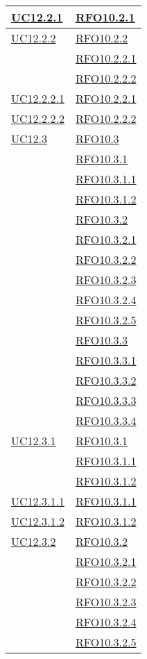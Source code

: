 \begin{longtable}{|>{\centering}m{5cm}|m{5cm}<{\centering}|}
\hyperlink{UC12.2.1}{UC12.2.1} & \hyperlink{RFO10.2.1}{RFO10.2.1}\\\hline
\hyperlink{UC12.2.2}{UC12.2.2} 
& \hyperlink{RFO10.2.2}{RFO10.2.2}\\
& \hyperlink{RFO10.2.2.1}{RFO10.2.2.1}\\
& \hyperlink{RFO10.2.2.2}{RFO10.2.2.2}\\\hline

\hyperlink{UC12.2.2.1}{UC12.2.2.1} & \hyperlink{RFO10.2.2.1}{RFO10.2.2.1}\\\hline
\hyperlink{UC12.2.2.2}{UC12.2.2.2} & \hyperlink{RFO10.2.2.2}{RFO10.2.2.2}\\\hline

\hyperlink{UC12.3}{UC12.3}
& \hyperlink{RFO10.3}{RFO10.3}\\
& \hyperlink{RFO10.3.1}{RFO10.3.1}\\
& \hyperlink{RFO10.3.1.1}{RFO10.3.1.1}\\
& \hyperlink{RFO10.3.1.2}{RFO10.3.1.2}\\
& \hyperlink{RFO10.3.2}{RFO10.3.2}\\
& \hyperlink{RFO10.3.2.1}{RFO10.3.2.1}\\
& \hyperlink{RFO10.3.2.2}{RFO10.3.2.2}\\
& \hyperlink{RFO10.3.2.3}{RFO10.3.2.3}\\
& \hyperlink{RFO10.3.2.4}{RFO10.3.2.4}\\
& \hyperlink{RFO10.3.2.5}{RFO10.3.2.5}\\
& \hyperlink{RFO10.3.3}{RFO10.3.3}\\
& \hyperlink{RFO10.3.3.1}{RFO10.3.3.1}\\
& \hyperlink{RFO10.3.3.2}{RFO10.3.3.2}\\
& \hyperlink{RFO10.3.3.3}{RFO10.3.3.3}\\
& \hyperlink{RFO10.3.3.4}{RFO10.3.3.4}\\\hline

\hyperlink{UC12.3.1}{UC12.3.1}
& \hyperlink{RFO10.3.1}{RFO10.3.1}\\
& \hyperlink{RFO10.3.1.1}{RFO10.3.1.1}\\
& \hyperlink{RFO10.3.1.2}{RFO10.3.1.2}\\\hline

\hyperlink{UC12.3.1.1}{UC12.3.1.1} & \hyperlink{RFO10.3.1.1}{RFO10.3.1.1}\\\hline
\hyperlink{UC12.3.1.2}{UC12.3.1.2} & \hyperlink{RFO10.3.1.2}{RFO10.3.1.2}\\\hline

\hyperlink{UC12.3.2}{UC12.3.2}
& \hyperlink{RFO10.3.2}{RFO10.3.2}\\
& \hyperlink{RFO10.3.2.1}{RFO10.3.2.1}\\
& \hyperlink{RFO10.3.2.2}{RFO10.3.2.2}\\
& \hyperlink{RFO10.3.2.3}{RFO10.3.2.3}\\
& \hyperlink{RFO10.3.2.4}{RFO10.3.2.4}\\
& \hyperlink{RFO10.3.2.5}{RFO10.3.2.5}\\\hline


\end{longtable}
